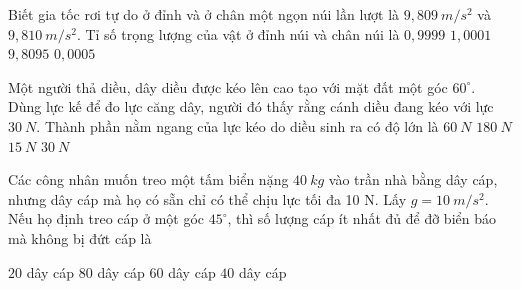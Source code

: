 \begin{ex}%
Biết gia tốc rơi tự do ở đỉnh và ở chân một ngọn núi lần lượt là $9,809\ m/s^2$ và $9,810\ m/s^2$. Tỉ số trọng lượng của vật ở đỉnh núi và chân núi là
\choice
{\True $0,9999$}
{$1,0001$}
{$9,8095$}
{$0,0005$}
 \end{ex}
\begin{ex}%
Một người thả diều, dây diều được kéo lên cao tạo với mặt đất một góc $60^\circ$. Dùng lực kế để đo lực căng dây, người đó thấy rằng cánh diều đang kéo với lực $30 \ N$. Thành phần nằm ngang của lực kéo do diều sinh ra có độ lớn là
\choice
{$60 \ N$}
{$180 \ N$}
{\True $15 \ N$}
{$30 \ N$}
\end{ex}
\begin{ex}%
Các công nhân muốn treo một tấm biển nặng $40 \ kg$ vào trần nhà bằng dây cáp, nhưng dây cáp mà họ có sẵn chỉ có thể chịu lực tối đa 10 N. Lấy $g=10\ m/s^2$. Nếu họ định treo cáp ở một góc $45^\circ$, thì số lượng cáp ít nhất đủ để đỡ biển báo mà không bị đứt cáp là

\choice
{$20$ dây cáp}
{$80$ dây cáp}
{\True $60$ dây cáp}
{$40$ dây cáp}
 \end{ex}




















